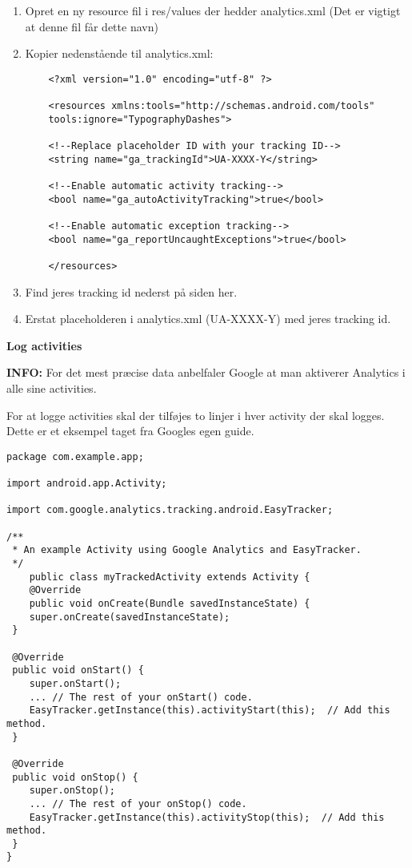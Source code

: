 \begin{enumerate}
	\item Opret en ny resource fil i res/values der hedder analytics.xml (Det er vigtigt at denne fil får dette navn)
	\item Kopier nedenstående til analytics.xml:
	\begin{lstlisting}
	<?xml version="1.0" encoding="utf-8" ?>
	
	<resources xmlns:tools="http://schemas.android.com/tools" 
	tools:ignore="TypographyDashes">
	
	<!--Replace placeholder ID with your tracking ID-->
	<string name="ga_trackingId">UA-XXXX-Y</string>
	
	<!--Enable automatic activity tracking-->
	<bool name="ga_autoActivityTracking">true</bool>
	
	<!--Enable automatic exception tracking-->
	<bool name="ga_reportUncaughtExceptions">true</bool>
	
	</resources>
	\end{lstlisting}
	\item Find jeres tracking id nederst på siden her.
	\item Erstat placeholderen i analytics.xml (UA-XXXX-Y) med jeres tracking id.
\end{enumerate}

\textbf{Log activities}

\textbf{INFO:} For det mest præcise data anbelfaler Google at man aktiverer Analytics i alle sine activities.

For at logge activities skal der tilføjes to linjer i hver activity der skal logges.
Dette er et eksempel taget fra Googles egen guide.

\begin{lstlisting}
package com.example.app;

import android.app.Activity;

import com.google.analytics.tracking.android.EasyTracker;

/**
 * An example Activity using Google Analytics and EasyTracker.
 */
	public class myTrackedActivity extends Activity {
	@Override
	public void onCreate(Bundle savedInstanceState) {
	super.onCreate(savedInstanceState);
 }

 @Override
 public void onStart() {
	super.onStart();
	... // The rest of your onStart() code.
	EasyTracker.getInstance(this).activityStart(this);  // Add this method.
 }

 @Override
 public void onStop() {
	super.onStop();
	... // The rest of your onStop() code.
	EasyTracker.getInstance(this).activityStop(this);  // Add this method.
 }
}
\end{lstlisting}

